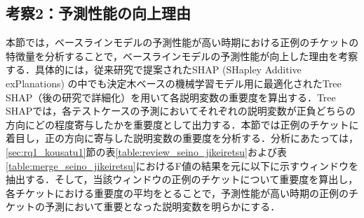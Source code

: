 \documentclass[submit]{ipsj}
\begin{document}



\subsection{考察2：予測性能の向上理由}\label{sec:rq1_kousatu2}
本節では，ベースラインモデルの予測性能が高い時期における正例のチケットの特徴量を分析することで，ベースラインモデルの予測性能が向上した理由を考察する．具体的には，従来研究\cite{shap}で提案されたSHAP (SHapley Additive exPlanations) の中でも決定木ベースの機械学習モデル用に最適化されたTree SHAP（後の研究\cite{TreeSHAP}で詳細化）を用いて各説明変数の重要度を算出する．Tree SHAPでは，各テストケースの予測においてそれぞれの説明変数が正負どちらの方向にどの程度寄与したかを重要度として出力する．本節では正例のチケットに着目し，正の方向に寄与した説明変数の重要度を分析する．分析にあたっては，\ref{sec:rq1_kousatu1}節の表\ref{table:review_seino_jikeiretsu}および表\ref{table:merge_seino_jikeiretsu}におけるF値の結果を元に以下に示すウィンドウを抽出する．そして，当該ウィンドウの正例のチケットについて重要度を算出し，各チケットにおける重要度の平均をとることで，予測性能が高い時期の正例のチケットの予測において重要となった説明変数を明らかにする．
\end{document}
